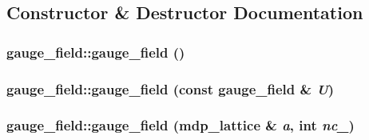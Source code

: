 \subsection{Constructor \& Destructor Documentation}
\hypertarget{classgauge__field_abdb50dfc413d1c22904a0ea38fc72e34}{
\subsubsection[{gauge\_\-field}]{\setlength{\rightskip}{0pt plus 5cm}gauge\_\-field::gauge\_\-field ()}}
\label{classgauge__field_abdb50dfc413d1c22904a0ea38fc72e34}
\hypertarget{classgauge__field_a0500e23c8bd48d78650235e6ae668ab0}{
\subsubsection[{gauge\_\-field}]{\setlength{\rightskip}{0pt plus 5cm}gauge\_\-field::gauge\_\-field (const {\bf gauge\_\-field} \& {\em U})}}
\label{classgauge__field_a0500e23c8bd48d78650235e6ae668ab0}
\hypertarget{classgauge__field_adcfa1a4c412dc26688307e95f3ed42b5}{
\subsubsection[{gauge\_\-field}]{\setlength{\rightskip}{0pt plus 5cm}gauge\_\-field::gauge\_\-field ({\bf mdp\_\-lattice} \& {\em a}, \/  int {\em nc\_\-})}}
\label{classgauge__field_adcfa1a4c412dc26688307e95f3ed42b5}


